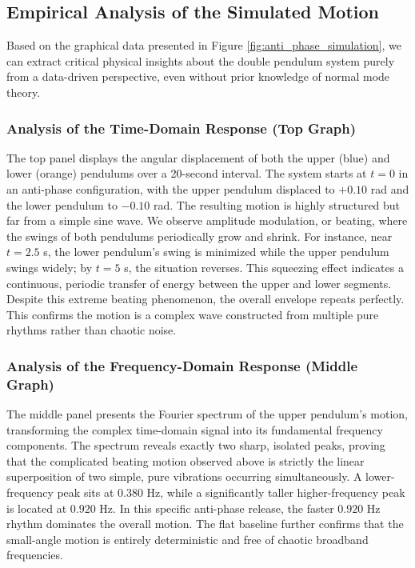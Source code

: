 \documentclass[12pt, a4paper, twoside]{article}
\begin{document}
\subsection{Empirical Analysis of the Simulated Motion}
Based on the graphical data presented in Figure \ref{fig:anti_phase_simulation}, we can extract critical physical insights about the double pendulum system purely from a data-driven perspective, even without prior knowledge of normal mode theory.

\subsubsection{Analysis of the Time-Domain Response (Top Graph)}
The top panel displays the angular displacement of both the upper (blue) and lower (orange) pendulums over a 20-second interval. The system starts at $t=0$ in an anti-phase configuration, with the upper pendulum displaced to $+0.10$ rad and the lower pendulum to $-0.10$ rad. The resulting motion is highly structured but far from a simple sine wave. We observe amplitude modulation, or beating, where the swings of both pendulums periodically grow and shrink. For instance, near $t=2.5$ s, the lower pendulum's swing is minimized while the upper pendulum swings widely; by $t=5$ s, the situation reverses. This squeezing effect indicates a continuous, periodic transfer of energy between the upper and lower segments. Despite this extreme beating phenomenon, the overall envelope repeats perfectly. This confirms the motion is a complex wave constructed from multiple pure rhythms rather than chaotic noise.

\subsubsection{Analysis of the Frequency-Domain Response (Middle Graph)}
The middle panel presents the Fourier spectrum of the upper pendulum's motion, transforming the complex time-domain signal into its fundamental frequency components. The spectrum reveals exactly two sharp, isolated peaks, proving that the complicated beating motion observed above is strictly the linear superposition of two simple, pure vibrations occurring simultaneously. A lower-frequency peak sits at $0.380 \text{ Hz}$, while a significantly taller higher-frequency peak is located at $0.920 \text{ Hz}$. In this specific anti-phase release, the faster $0.920 \text{ Hz}$ rhythm dominates the overall motion. The flat baseline further confirms that the small-angle motion is entirely deterministic and free of chaotic broadband frequencies.
\end{document}

